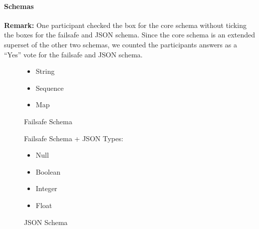 \paragraph{Schemas}

\textbf{Remark:} One participant checked the box for the core schema without ticking the boxes for the failsafe and JSON schema. Since the core schema is an extended superset of the other two schemas, we counted the participants answers as a “Yes” vote for the failsafe and JSON schema.

\begin{figure}[H]
  \begin{minipage}[t]{0.48\textwidth}
    \vspace{0pt}
    \begin{bchart}[max=9, width=0.85\textwidth]
      \bcxlabel{}
    \end{bchart}
  \end{minipage}
  \begin{minipage}[t]{0.48\textwidth}
    \vspace{0pt}
    \begin{itemize}
      \item String
      \item Sequence
      \item Map
    \end{itemize}
  \end{minipage}
  \caption{Failsafe Schema}
\end{figure}

\begin{figure}[H]
  \begin{minipage}[t]{0.48\textwidth}
    \vspace{0pt}
    \begin{bchart}[max=9, width=0.85\textwidth]
    \end{bchart}
  \end{minipage}
  \begin{minipage}[t]{0.48\textwidth}
    \vspace{0pt}
    Failsafe Schema + JSON Types:
    \begin{minipage}[t]{2cm}
      \begin{itemize}[leftmargin=*]
        \item Null
        \item Boolean
        \item Integer
        \item Float
      \end{itemize}
    \end{minipage}
  \end{minipage}
  \caption{JSON Schema}
\end{figure}

